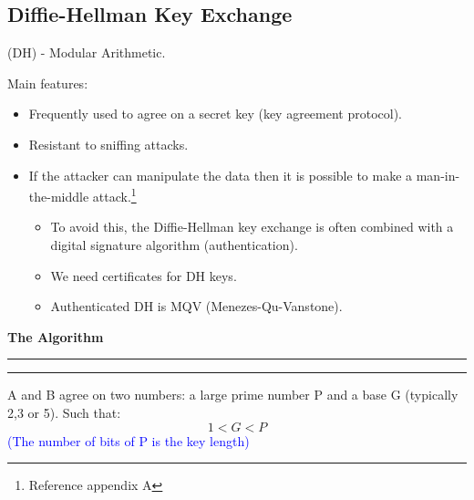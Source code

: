 \subsection{Diffie-Hellman Key Exchange}
\begin{center}
    (DH) - Modular Arithmetic.
\end{center}
Main features:
\begin{itemize}
    \item Frequently used to agree on a secret key (key agreement protocol).
    \item Resistant to sniffing attacks.
    \item If the attacker can manipulate the data then it is possible to make a man-in-the-middle attack.\footnote{Reference appendix A}
    \begin{itemize}
        \item To avoid this, the Diffie-Hellman key exchange is often combined with a digital signature algorithm (authentication).
        \item We need certificates for DH keys.
        \item Authenticated DH is MQV (Menezes-Qu-Vanstone).
    \end{itemize}
\end{itemize}

\begin{center}
    \textbf{The Algorithm}
\end{center}
\begin{multicols}{2}
    \begin{center}
        \vspace{0.2cm}
        \hrule
    \end{center}

\columnbreak
\columnseprule=1pt

    \begin{center}
        \vspace{0.2cm}
        \hrule
    \end{center}
    
\end{multicols}

\begin{center}
    A and B agree on two numbers: a large prime number P and a base G (typically 2,3 or 5). Such that:
    \[
        1 < G < P
    \]
    \textcolor{Blue}{(The number of bits of P is the key length)}
\end{center}

